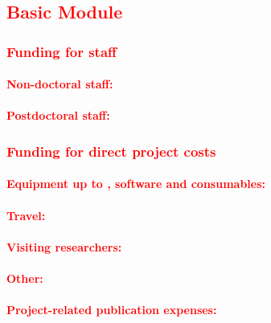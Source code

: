 \documentclass[a4paper,11pt,numbers=noenddot,parskip=half-]{scrreprt}
\begin{document}
\subsection{\textcolor{red}{Basic Module}}
\subsubsection{\textcolor{red}{Funding for staff}}
\paragraph{\textcolor{red}{Non-doctoral staff:}}
\myblindtext

\paragraph{\textcolor{red}{Postdoctoral staff:}}
\myblindtext

\subsubsection{\textcolor{red}{Funding for direct project costs}}
\myblindtext

\paragraph{\textcolor{red}{Equipment up to , software and consumables:}}
\myblindtext

\paragraph{\textcolor{red}{Travel:}}
\myblindtext

\paragraph{\textcolor{red}{Visiting researchers:}}
\myblindtext

\paragraph{\textcolor{red}{Other:}}
\myblindtext

\paragraph{\textcolor{red}{Project-related publication expenses:}}
\myblindtext
\end{document}
